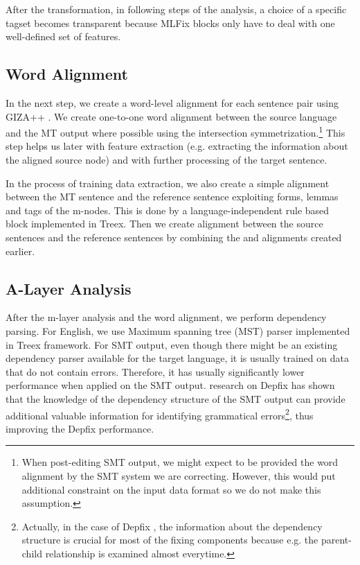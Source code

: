 After the transformation, in following steps of the analysis, a choice
of a specific tagset becomes transparent because MLFix blocks only
have to deal with one well-defined set of features.

\subsection{Word Alignment}

In the next step, we create a word-level alignment for each sentence pair
using GIZA++ \citep{och:ney:2000}. We create one-to-one word alignment between the source language
and the MT output where possible
using the intersection symmetrization.\footnote{When post-editing SMT output, we might expect to be provided
the word alignment by the SMT system we are correcting. However, this would put additional constraint
on the input data format so we do not make this assumption.} This step helps us later with feature extraction (e.g. extracting the information about the aligned source node)
and with further processing of the target sentence.

In the process of training data extraction, we also create a simple alignment between
the MT sentence and the reference sentence exploiting forms, lemmas and tags
of the m-nodes. This is done by a language-independent rule based block implemented in Treex.
Then we create alignment between the source sentences and the reference sentences by combining
the  and  alignments created earlier.

\subsection{A-Layer Analysis}

After the m-layer analysis and the word alignment, we perform dependency parsing.
For English, we use Maximum spanning tree (MST) parser \citep{mcdonald:pereira:ribarov:hajic:2005}
implemented in Treex framework. For SMT output, even though there might
be an existing dependency parser available for the target language, it is usually
trained on data that do not contain errors. Therefore, it has usually significantly
lower performance when applied on the SMT output.  research on Depfix has shown
that the knowledge of the dependency structure of the SMT output can provide additional
valuable information for identifying grammatical errors\footnote{Actually, in the case of Depfix
, the information about the dependency structure is crucial for most of the fixing components
because e.g. the parent-child relationship is examined almost everytime.}, thus improving
the Depfix performance.

